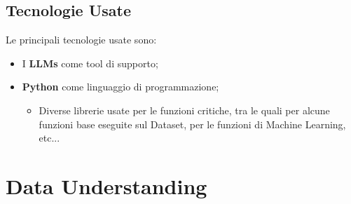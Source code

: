 \documentclass[a4paper,12pt]{report}
\begin{document}
\section{Tecnologie Usate}
Le principali tecnologie usate sono:
\begin{itemize}
    \item I \textbf{LLMs} come tool di supporto;
    \item \textbf{Python} come linguaggio di programmazione;
    \begin{itemize}
        \item Diverse librerie usate per le funzioni critiche, tra le quali \texttt{\color{red}{pandas}} per alcune funzioni base eseguite sul Dataset, \texttt{\color{red}{sklearn}} per le funzioni di Machine Learning, etc...
    \end{itemize}
\end{itemize}

\newpage

\begingroup%
\makeatletter%
\let\clearpage\relax%
\vspace*{\fill}%
\vspace*{\dimexpr-50\p@-\baselineskip}%
\chapter{Data Understanding}
\vspace*{\fill}%
\endgroup
\newpage
\end{document}
